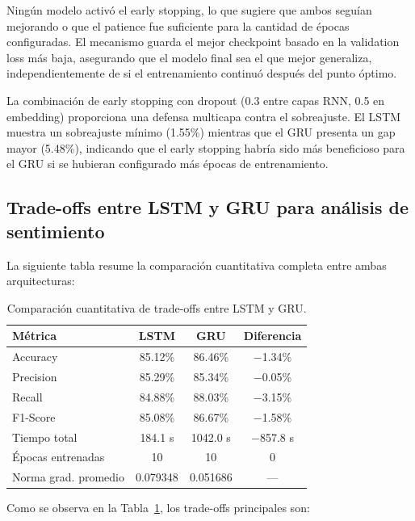 Ningún modelo activó el early stopping, lo que sugiere que ambos seguían mejorando o que el patience fue suficiente para la cantidad de épocas configuradas. El mecanismo guarda el mejor checkpoint basado en la validation loss más baja, asegurando que el modelo final sea el que mejor generaliza, independientemente de si el entrenamiento continuó después del punto óptimo.

La combinación de early stopping con dropout (0.3 entre capas RNN, 0.5 en embedding) proporciona una defensa multicapa contra el sobreajuste. El LSTM muestra un sobreajuste mínimo (1.55\%) mientras que el GRU presenta un gap mayor (5.48\%), indicando que el early stopping habría sido más beneficioso para el GRU si se hubieran configurado más épocas de entrenamiento.

\subsection{Trade-offs entre LSTM y GRU para análisis de sentimiento}

La siguiente tabla resume la comparación cuantitativa completa entre ambas arquitecturas:

\begin{table}[H]
\centering
\caption{Comparación cuantitativa de trade-offs entre LSTM y GRU.}
\label{tab:tradeoffs}
\begin{tabular}{lccc}
\toprule
\textbf{Métrica} & \textbf{LSTM} & \textbf{GRU} & \textbf{Diferencia} \\
\midrule
Accuracy & 85.12\% & 86.46\% & $-$1.34\% \\
Precision & 85.29\% & 85.34\% & $-$0.05\% \\
Recall & 84.88\% & 88.03\% & $-$3.15\% \\
F1-Score & 85.08\% & 86.67\% & $-$1.58\% \\
Tiempo total & 184.1 s & 1042.0 s & $-$857.8 s \\
Épocas entrenadas & 10 & 10 & 0 \\
Norma grad. promedio & 0.079348 & 0.051686 & --- \\
\bottomrule
\end{tabular}
\end{table}

Como se observa en la Tabla~\ref{tab:tradeoffs}, los trade-offs principales son:

